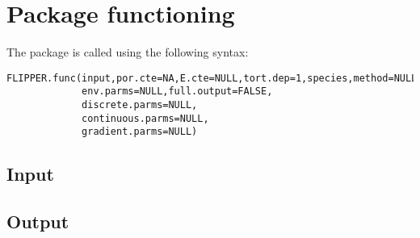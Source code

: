 \documentclass[10pt]{article}
\begin{document}
\section{Package functioning}
\label{sect_functioning}

The package is called using the following syntax:
\begin{verbatim}
FLIPPER.func(input,por.cte=NA,E.cte=NULL,tort.dep=1,species,method=NULL,
             env.parms=NULL,full.output=FALSE,
             discrete.parms=NULL,
             continuous.parms=NULL,
             gradient.parms=NULL)
\end{verbatim}

\subsection{Input}

\subsection{Output}

\end{document}
